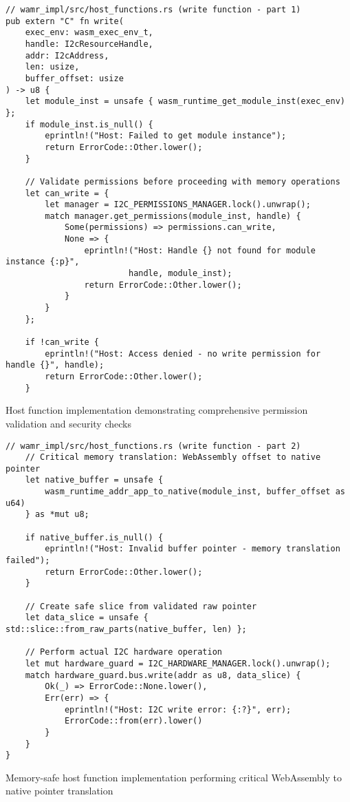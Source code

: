 \begin{listing}[H]
\begin{verbatim}
// wamr_impl/src/host_functions.rs (write function - part 1)
pub extern "C" fn write(
    exec_env: wasm_exec_env_t,
    handle: I2cResourceHandle,
    addr: I2cAddress,
    len: usize,
    buffer_offset: usize
) -> u8 {
    let module_inst = unsafe { wasm_runtime_get_module_inst(exec_env) };
    if module_inst.is_null() {
        eprintln!("Host: Failed to get module instance");
        return ErrorCode::Other.lower();
    }

    // Validate permissions before proceeding with memory operations
    let can_write = {
        let manager = I2C_PERMISSIONS_MANAGER.lock().unwrap();
        match manager.get_permissions(module_inst, handle) {
            Some(permissions) => permissions.can_write,
            None => {
                eprintln!("Host: Handle {} not found for module instance {:p}", 
                         handle, module_inst);
                return ErrorCode::Other.lower();
            }
        }
    };

    if !can_write {
        eprintln!("Host: Access denied - no write permission for handle {}", handle);
        return ErrorCode::Other.lower();
    }
\end{verbatim}
\caption{Host function implementation demonstrating comprehensive permission validation and security checks}
\label{lst:wamr-host-function-pt1}
\end{listing}

\begin{listing}[H]
\begin{verbatim}
// wamr_impl/src/host_functions.rs (write function - part 2)
    // Critical memory translation: WebAssembly offset to native pointer
    let native_buffer = unsafe {
        wasm_runtime_addr_app_to_native(module_inst, buffer_offset as u64)
    } as *mut u8;
    
    if native_buffer.is_null() {
        eprintln!("Host: Invalid buffer pointer - memory translation failed");
        return ErrorCode::Other.lower();
    }

    // Create safe slice from validated raw pointer
    let data_slice = unsafe { std::slice::from_raw_parts(native_buffer, len) };
    
    // Perform actual I2C hardware operation
    let mut hardware_guard = I2C_HARDWARE_MANAGER.lock().unwrap();
    match hardware_guard.bus.write(addr as u8, data_slice) {
        Ok(_) => ErrorCode::None.lower(),
        Err(err) => {
            eprintln!("Host: I2C write error: {:?}", err);
            ErrorCode::from(err).lower()
        }
    }
}
\end{verbatim}
\caption{Memory-safe host function implementation performing critical WebAssembly to native pointer translation}
\label{lst:wamr-host-function-pt2}
\end{listing}


